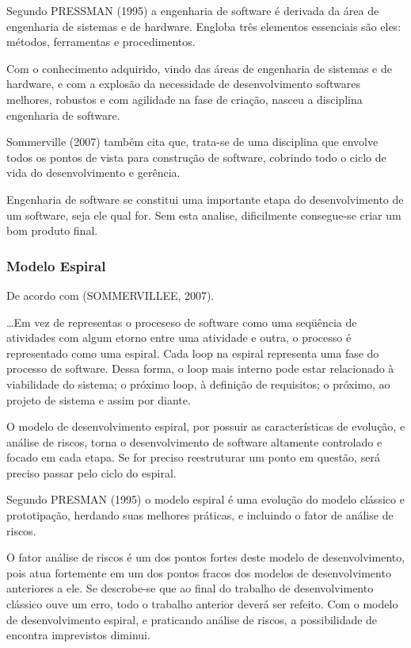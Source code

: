 Segundo PRESSMAN (1995) a engenharia de software é derivada da área de engenharia de sistemas e de hardware. Engloba três elementos essenciais são eles: métodos, ferramentas e procedimentos.

Com o conhecimento adquirido, vindo das áreas de engenharia de sistemas e de hardware, e com a explosão da necessidade de desenvolvimento softwares melhores, robustos e com agilidade na fase de criação, nasceu a disciplina engenharia de software.

	Sommerville (2007) também cita que, trata-se de uma disciplina que envolve todos os pontos de vista para construção de software, cobrindo todo o ciclo de vida do desenvolvimento e gerência.
	
	Engenharia de software se constitui uma importante etapa do desenvolvimento de um software, seja ele qual for. Sem esta analise, dificilmente consegue-se criar um bom produto final.	

\subsubsection{Modelo Espiral}

De acordo com  (SOMMERVILLEE, 2007).

\begin{citacao}
\ldots Em vez de representas o proceseso de software como uma seqüência de atividades com algum etorno entre uma atividade e outra, o processo é representado como uma espiral. Cada loop na espiral representa uma fase do processo de software. Dessa forma, o loop mais interno pode estar relacionado à viabilidade do sistema; o próximo loop, à definição de requisitos; o próximo, ao projeto de sistema e assim por diante.
\end{citacao}

O modelo de desenvolvimento espiral, por possuir as características de evolução, e análise de riscos, torna o desenvolvimento de software altamente controlado e focado em cada etapa. Se for preciso reestruturar um ponto em questão, será preciso passar pelo ciclo do espiral.

Segundo PRESMAN (1995) o modelo espiral é uma evolução do modelo clássico e prototipação, herdando suas melhores práticas, e incluindo o fator de análise de riscos.

O fator análise de riscos é um dos pontos fortes deste modelo de desenvolvimento, pois  atua fortemente em um dos pontos fracos dos modelos de desenvolvimento anteriores a ele. Se descrobe-se que ao final do trabalho de desenvolvimento clássico ouve um erro, todo o trabalho anterior deverá ser refeito. Com o modelo de desenvolvimento espiral, e praticando análise de riscos, a possibilidade de encontra imprevistos diminui.

